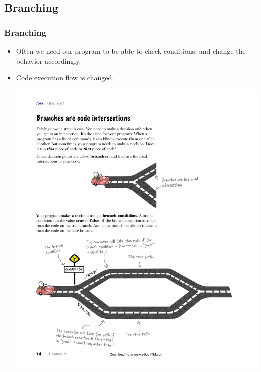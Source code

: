 \documentclass{beamer}
\begin{document}
\subsection[Branching]{Branching}
\begin{frame}[fragile]
\frametitle{Branching}
\begin{itemize}
\item Often we need our program to be able  to check conditions, and change the behavior accordingly. 
\item Code \alert{ execution flow} is changed. 
\centerline{\includegraphics[width=0.8 \textwidth]{Branching}}
\end{itemize}
\end{frame}
\end{document}
